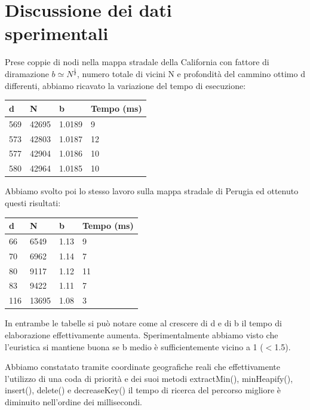 \documentclass[12pt,a4paper]{report}
\begin{document}
\chapter{Discussione dei dati\\sperimentali}

Prese coppie di nodi nella mappa stradale della California con fattore di diramazione \(b \simeq N^\frac{1}{d}\), numero totale di vicini N e profondità del cammino ottimo d differenti, abbiamo ricavato la variazione del tempo di esecuzione:

\begin{table}[H]
	\centering
	\begin{tabular}{@{}llll@{}}
		\toprule
		\textbf{d} & \textbf{N} & \textbf{b} & \textbf{Tempo (ms)}       \\ \midrule
		569 & 42695 & 1.0189 & 9  \\
		573 & 42803 & 1.0187 & 12 \\
		577 & 42904 & 1.0186 & 10 \\
		580 & 42964 & 1.0185 & 10 \\ \bottomrule
	\end{tabular}
\end{table}

Abbiamo svolto poi lo stesso lavoro sulla mappa stradale di Perugia ed ottenuto questi risultati:

\begin{table}[H]
	\centering
	\begin{tabular}{@{}llll@{}}
		\toprule
		\textbf{d} & \textbf{N} & \textbf{b} & \textbf{Tempo (ms)}       \\ \midrule
		66  & 6549  & 1.13 & 9  \\
		70  & 6962  & 1.14 & 7  \\
		80  & 9117  & 1.12 & 11 \\
		83  & 9422  & 1.11 & 7  \\
		116 & 13695 & 1.08 & 3 \\ \bottomrule
	\end{tabular}
\end{table}

In entrambe le tabelle si può notare come al crescere di d e di b il tempo di elaborazione effettivamente aumenta. Sperimentalmente abbiamo visto che l'euristica si mantiene buona se b medio è sufficientemente vicino a 1 (\(<\)1.5).

Abbiamo constatato tramite coordinate geografiche reali che effettivamente l'utilizzo di una coda di priorità e dei suoi metodi extractMin(), minHeapify(),
\\insert(), delete() e decreaseKey() il tempo di ricerca del percorso migliore è diminuito nell'ordine dei millisecondi.
\end{document}
